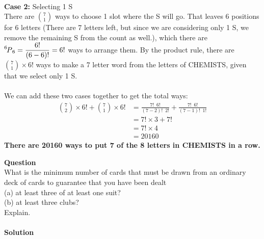 \documentclass[article, 11pt]{article}
\newcounter{question}
\def\questionnum{{\Large\bfseries{Question \arabic{question} }}\\[1em]}
\newcommand{\question}{
    \stepcounter{question}
    \questionnum
}
\newcommand{\solution}{
    {{\large\bfseries{Solution}}}
}
\newcommand{\df}{\displaystyle\frac} %
\newcommand\perm[2][^n]{\prescript{#1\mkern-2.5mu}{}P_{#2}}
\begin{document}
\\
\textbf{Case 2:} Selecting 1 S \\
There are $\displaystyle\binom{7}{1}$ ways to choose 1 slot where the S will go. That leaves 6 positions for 6 letters (There are 7 letters left, but since we are considering only 1 S, we remove the remaining S from the count as well.), which there are $\perm[6]{6} = \df{6!}{(6-6)!} = 6!$ ways to arrange them. By the product rule, there are $\displaystyle\binom{7}{1} \times 6!$ ways to make a 7 letter word from the letters of CHEMISTS, given that we select only 1 S. \\
\\
We can add these two cases together to get the total ways: 
\begin{align*}
    \binom{7}{2} \times 6! + \binom{7}{1} \times 6! &= \frac{7!\enspace 6!}{(7-2)! \enspace 2!} + \frac{7! \enspace 6!}{(7-1)! \enspace 1!} \\
                                                    &= 7! \times 3 + 7! \\
                                                    &= 7! \times 4 \\
                                                    &= 20160
\end{align*}
\textbf{There are 20160 ways to put 7 of the 8 letters in CHEMISTS in a row.}
\newpage
\question 
What is the minimum number of cards that must be drawn from an ordinary deck of cards to guarantee that you have been dealt \\ (a) at least three of at least one suit?\\ (b) at least three clubs?  \\ Explain. \\
\\
\solution
\end{document}
